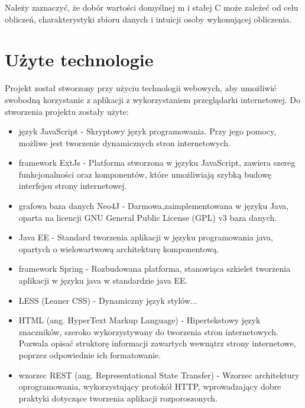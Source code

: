 Należy zaznaczyć, że dobór wartości domyślnej m i stałej C może zależeć od celu obliczeń, charakterystyki zbioru danych i intuicji osoby wykonującej obliczenia.

\section{Użyte technologie}
Projekt został stworzony przy użyciu technologii webowych, aby umożliwić swobodną korzystanie z aplikacji z wykorzystaniem przeglądarki internetowej. Do stworzenia projektu zostały użyte:
\begin{itemize}
\item język JavaScript - Skryptowy język programowania. Przy jego pomocy, możliwe jest tworzenie dynamicznych stron internetowych.
\item framework ExtJs - Platforma stworzona w języku JavaScript, zawiera szereg funkcjonalności oraz komponentów, które umożliwiają szybką budowę interfejsu strony internetowej. 
\item grafowa baza danych Neo4J - Darmowa,zaimplementowana w języku Java, oparta na licencji GNU General Public License (GPL) v3 baza danych.
\item Java EE - Standard tworzenia aplikacji w języku programowania java, opartych o wielowartwową architekturę komponentową.
\item framework Spring - Rozbudowana platforma, stanowiąca szkielet tworzenia aplikacji w języku java w standardzie java EE.
\item LESS (Leaner CSS) - Dynamiczny język stylów...
\item HTML (ang. HyperText Markup Language) - Hipertekstowy język znaczników, szeroko wykorzystywany do tworzenia stron internetowych. Pozwala opisać struktorę informacji zawartych wewnątrz strony internetowe, poprzez odpowiednie ich formatowanie.
\item wzorzec REST (ang. Representational State Transfer) - Wzorzec architektury oprogramowania, wykorzystujący protokół HTTP, wprowadzający dobre praktyki dotyczące tworzenia aplikacji rozporoszonych.
\end{itemize}
